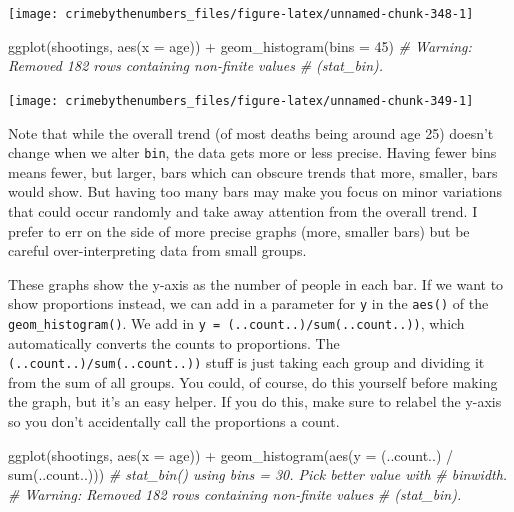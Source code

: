 \documentclass[
  a4paper,
]{krantz}
\makeatletter
\newenvironment{Shaded}{\begin{snugshade}}{\end{snugshade}}
\newcommand{\AttributeTok}[1]{\textcolor[rgb]{0.61,0.61,0.61}{#1}}
\newcommand{\CommentTok}[1]{\textcolor[rgb]{0.37,0.37,0.37}{\textit{#1}}}
\newcommand{\DecValTok}[1]{\textcolor[rgb]{0.06,0.06,0.06}{#1}}
\newcommand{\FunctionTok}[1]{\textcolor[rgb]{0,0,0}{#1}}
\newcommand{\NormalTok}[1]{#1}
\newcommand{\SpecialCharTok}[1]{\textcolor[rgb]{0,0,0}{#1}}
\newenvironment{kframe}{%
\medskip{}
\setlength{\fboxsep}{.8em}
 \def\at@end@of@kframe{}%
 \ifinner\ifhmode%
  \def\at@end@of@kframe{\end{minipage}}%
  \begin{minipage}{\columnwidth}%
 \fi\fi%
 \def\FrameCommand##1{\hskip\@totalleftmargin \hskip-\fboxsep
 \colorbox{shadecolor}{##1}\hskip-\fboxsep
     \hskip-\linewidth \hskip-\@totalleftmargin \hskip\columnwidth}%
 \MakeFramed {\advance\hsize-\width
   \@totalleftmargin\z@ \linewidth\hsize
   \@setminipage}}%
 {\par\unskip\endMakeFramed%
 \at@end@of@kframe}
\renewenvironment{Shaded}{\begin{kframe}}{\end{kframe}}
\makeatother
\begin{document}
\begin{center}\texttt{[image: crimebythenumbers\_files/figure-latex/unnamed-chunk-348-1]} \end{center}

\begin{Shaded}
\begin{Highlighting}[]
\FunctionTok{ggplot}\NormalTok{(shootings, }\FunctionTok{aes}\NormalTok{(}\AttributeTok{x =}\NormalTok{ age)) }\SpecialCharTok{+}
  \FunctionTok{geom\_histogram}\NormalTok{(}\AttributeTok{bins =} \DecValTok{45}\NormalTok{)}
\CommentTok{\# Warning: Removed 182 rows containing non{-}finite values}
\CommentTok{\# (stat\_bin).}
\end{Highlighting}
\end{Shaded}

\begin{center}\texttt{[image: crimebythenumbers\_files/figure-latex/unnamed-chunk-349-1]} \end{center}

Note that while the overall trend (of most deaths being
around age 25) doesn't change when we alter \texttt{bin},
the data gets more or less precise. Having fewer bins means
fewer, but larger, bars which can obscure trends that more,
smaller, bars would show. But having too many bars may make
you focus on minor variations that could occur randomly and
take away attention from the overall trend. I prefer to err
on the side of more precise graphs (more, smaller bars) but
be careful over-interpreting data from small groups.

These graphs show the y-axis as the number of people in each
bar. If we want to show proportions instead, we can add in a
parameter for \texttt{y} in the \texttt{aes()} of the
\texttt{geom\_histogram()}. We add in
\texttt{y\ =\ (..count..)/sum(..count..))}, which
automatically converts the counts to proportions. The
\texttt{(..count..)/sum(..count..))} stuff is just taking
each group and dividing it from the sum of all groups. You
could, of course, do this yourself before making the graph,
but it's an easy helper. If you do this, make sure to
relabel the y-axis so you don't accidentally call the
proportions a count.

\begin{Shaded}
\begin{Highlighting}[]
\FunctionTok{ggplot}\NormalTok{(shootings, }\FunctionTok{aes}\NormalTok{(}\AttributeTok{x =}\NormalTok{ age)) }\SpecialCharTok{+}
  \FunctionTok{geom\_histogram}\NormalTok{(}\FunctionTok{aes}\NormalTok{(}\AttributeTok{y =}\NormalTok{ (..count..) }\SpecialCharTok{/} \FunctionTok{sum}\NormalTok{(..count..)))}
\CommentTok{\# \textasciigrave{}stat\_bin()\textasciigrave{} using \textasciigrave{}bins = 30\textasciigrave{}. Pick better value with}
\CommentTok{\# \textasciigrave{}binwidth\textasciigrave{}.}
\CommentTok{\# Warning: Removed 182 rows containing non{-}finite values}
\CommentTok{\# (stat\_bin).}
\end{Highlighting}
\end{Shaded}
\end{document}
